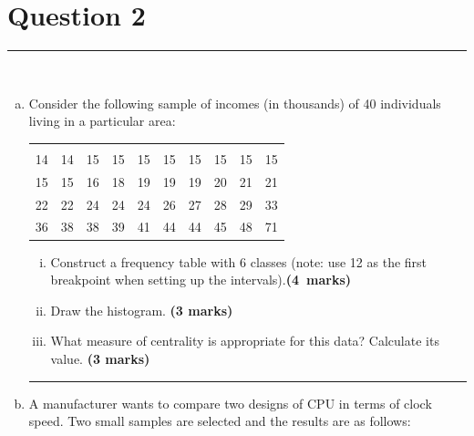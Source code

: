 \documentclass[12pt]{article}
\begin{document}
\section*{Question 2 }
\noindent\rule{\linewidth}{1pt}
\quad\\[-0.5cm]
\begin{enumerate}[a)]
\item Consider the following sample of incomes (in thousands) of 40 individuals living in a particular area:\\[-0.6cm]
    \begin{center}
    \begin{tabular}{|cccccccccc|}
    \hline
    &&&&&&&&&\\[-0.3cm]
    14 & 14 & 15 & 15 & 15 & 15 & 15 & 15 & 15 & 15 \\[0.1cm]
    15 & 15 & 16 & 18 & 19 & 19 & 19 & 20 & 21 & 21 \\[0.1cm]
    22 & 22 & 24 & 24 & 24 & 26 & 27 & 28 & 29 & 33 \\[0.1cm]
    36 & 38 & 38 & 39 & 41 & 44 & 44 & 45 & 48 & 71 \\[0.1cm]
    \hline
    \end{tabular}
    \end{center}
    \begin{enumerate}[i)]\itemsep0.3cm
    \item Construct a frequency table with 6 classes (note: use 12 as the first breakpoint when setting up the intervals).\hfill{\mbox{\scriptsize \bf (4 marks)}}
    \item Draw the histogram. \hfill{\scriptsize \bf (3 marks)}
    \item What measure of centrality is appropriate for this data? Calculate its value. \hfill{\scriptsize \bf (3 marks)}
    \end{enumerate}
\begin{center}\noindent\rule{0.4\linewidth}{0.5pt}\end{center}
\item A manufacturer wants to compare two designs of CPU in terms of clock speed. Two small samples are selected and the results are as follows:

\end{enumerate}
\end{document}

